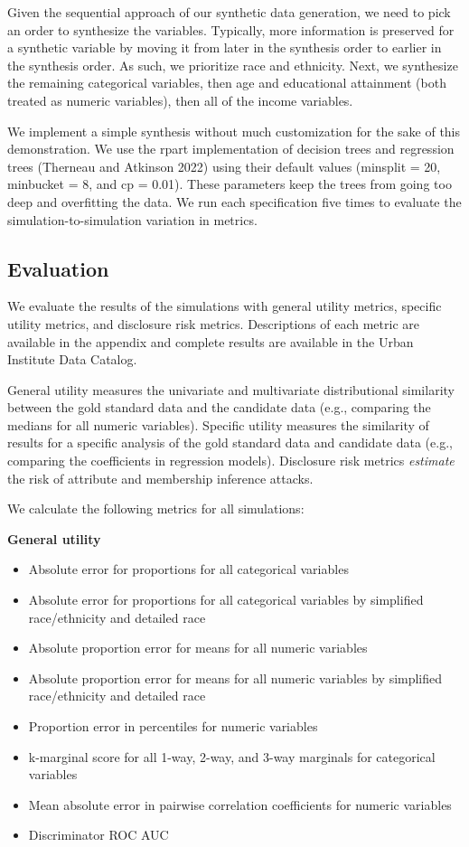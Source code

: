 \documentclass[
]{urban-formatting}
\providecommand{\tightlist}{%
  \setlength{\itemsep}{0pt}\setlength{\parskip}{0pt}}\usepackage{longtable,booktabs,array}
\begin{document}
Given the sequential approach of our synthetic data generation, we need
to pick an order to synthesize the variables. Typically, more
information is preserved for a synthetic variable by moving it from
later in the synthesis order to earlier in the synthesis order. As such,
we prioritize race and ethnicity. Next, we synthesize the remaining
categorical variables, then age and educational attainment (both treated
as numeric variables), then all of the income variables.

We implement a simple synthesis without much customization for the sake
of this demonstration. We use the rpart implementation of decision trees
and regression trees (Therneau and Atkinson 2022) using their default
values (minsplit = 20, minbucket = 8, and cp = 0.01). These parameters
keep the trees from going too deep and overfitting the data. We run each
specification five times to evaluate the simulation-to-simulation
variation in metrics.

\subsection{Evaluation}

We evaluate the results of the simulations with general utility metrics,
specific utility metrics, and disclosure risk metrics. Descriptions of
each metric are available in the appendix and complete results are
available in the Urban Institute Data Catalog.

General utility measures the univariate and multivariate distributional
similarity between the gold standard data and the candidate data (e.g.,
comparing the medians for all numeric variables). Specific utility
measures the similarity of results for a specific analysis of the gold
standard data and candidate data (e.g., comparing the coefficients in
regression models). Disclosure risk metrics \emph{estimate} the risk of
attribute and membership inference attacks.

We calculate the following metrics for all simulations:

\textbf{General utility}

\begin{itemize}
\tightlist
\item
  Absolute error for proportions for all categorical variables
\item
  Absolute error for proportions for all categorical variables by
  simplified race/ethnicity and detailed race
\item
  Absolute proportion error for means for all numeric variables
\item
  Absolute proportion error for means for all numeric variables by
  simplified race/ethnicity and detailed race
\item
  Proportion error in percentiles for numeric variables
\item
  k-marginal score for all 1-way, 2-way, and 3-way marginals for
  categorical variables
\item
  Mean absolute error in pairwise correlation coefficients for numeric
  variables
\item
  Discriminator ROC AUC
\end{itemize}
\end{document}
